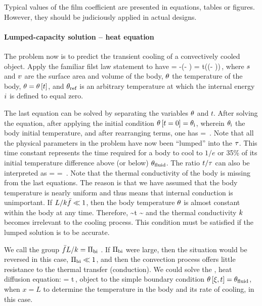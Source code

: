 Typical values of the film coefficient are presented in equations, tables or figures. However, they should be judiciously applied in actual designs.


\paragraph{Lumped-capacity solution -- heat equation}
The problem now is to predict the transient cooling of a convectively cooled object. Apply the familiar filst law statement to have
\beq
\flow\then = \rate\ien \implies
-\kavthconv\surf\left(\temp - \temp{}\right) 
    = \iod t\left(\dens\kshcap\vol\left(\temp - \temp{}\right)\right)\,,
\eeq
where $s$ and $v$ are the surface area and volume of the body, $\theta$ the temperature of the body, $\theta = \theta\left[{t}\right]$, and $\theta_\text{ref}$ is an arbitrary temperature at which the internal energy $i$ is defined to equal zero.

The last equation can be solved by separating the variables $\theta$ and $t$. After solving the equation, after applying the initial condition $\theta\left[{t = 0}\right] = \theta_\text{i}$, wherein $\theta_\text{i}$ the body initial temperature, and after rearranging terms, one has
\beq
{} = \exp{}\,.
\eeq
Note that all the physical parameters in the problem have now been ``lumped'' into the  $\tau$. This time constant represents the time required for a body to cool to $1/e$ or 35\% of its initial temperature difference above (or below) $\theta_\text{fluid}$. The ratio $t/\tau$ can also be interpreted as 
\beq
{} =  
                  = \,.
\eeq
Note that the thermal conductivity of the body is missing from the last equations. The reason is that we have assumed that the body temperature is nearly uniform and thus means that internal conduction is unimportant. If $L/k\bar{f} \ll 1$, then the body temperature $\theta$ is almost constant within the body at any time. Therefore,
\beq
{}  \implies
\temp{} \sim \temp\vat t 
                   \sim \temp{}
\eeq
and the thermal conductivity $k$ becomes irrelevant to the cooling process. This condition must be satisfied if the lumped solution is to be accurate.

We call the group $\bar{f} L/k = \Pi_\text{bi}$ . If $\Pi_\text{bi}$ were large, then the situation would be reversed in this case, $\Pi_\text{bi}\ll 1$, and then the convection process offers little resistance to the thermal transfer (conduction). We could solve the , \aka heat diffusion equation:
\beq
\kthdiff{}\temp = \ipd t\temp\,,
\eeq
object to the simple boundary condition $\theta\left[{\xi, t}\right] = \theta_\text{fluid}$, when $x = L$ to determine the temperature in the body and its rate of cooling, in this case.

